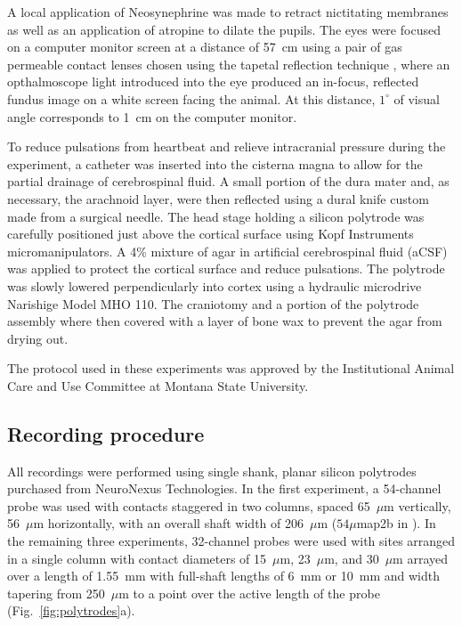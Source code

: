 A local application of Neosynephrine was made to retract nictitating membranes
as well as an application of atropine to dilate the pupils. The eyes were
focused on a computer monitor screen at a distance of 57~cm using a pair of
gas permeable contact lenses chosen using the tapetal reflection technique
\cite{Pettigrew:1979fk}, where an opthalmoscope light introduced into the eye
produced an in-focus, reflected fundus image on a white screen facing the
animal. At this distance, $1^\circ$ of visual angle corresponds to 1~cm on the
computer monitor.

To reduce pulsations from heartbeat and relieve intracranial pressure during
the experiment, a catheter was inserted into the cisterna magna to allow for
the partial drainage of cerebrospinal fluid. A small portion of the dura mater
and, as necessary, the arachnoid layer, were then reflected using a dural
knife custom made from a surgical needle. The head stage holding a silicon
polytrode was carefully positioned just above the cortical surface using Kopf
Instruments micromanipulators. A 4\% mixture of agar in artificial
cerebrospinal fluid (aCSF) was applied to protect the cortical surface and
reduce pulsations. The polytrode was slowly lowered perpendicularly into
cortex using a hydraulic microdrive Narishige Model MHO 110. The
craniotomy and a portion of the polytrode assembly where then covered with a
layer of bone wax to prevent the agar from drying out.

The protocol used in these experiments was approved by the Institutional
Animal Care and Use Committee at Montana State University.

\subsection{Recording procedure}

All recordings were performed using single shank, planar silicon
polytrodes purchased from NeuroNexus Technologies. In the first
experiment, a 54-channel probe was used with contacts staggered in two
columns, spaced 65~$\mu$m vertically, 56~$\mu$m horizontally, with an
overall shaft width of 206~$\mu$m ($54\mu$map2b in
\citet{Blanche:2005uq}). In the remaining three experiments,
32-channel probes were used with sites arranged in a single column
with contact diameters of 15~$\mu$m, 23~$\mu$m, and 30~$\mu$m arrayed
over a length of 1.55~mm with full-shaft lengths of 6~mm or 10~mm and
width tapering from 250~$\mu$m to a point over the active length of
the probe (Fig.~\ref{fig:polytrodes}a).

